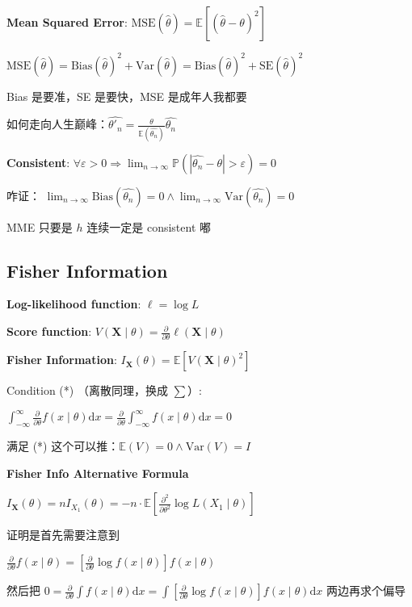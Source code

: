\documentclass[9pt,landscape]{article}
\begin{document}
\begin{multicols}{3}
\textbf{Mean Squared Error}: $\mathrm{MSE}(\hat{\theta})=\mathbb{E}\left[\left(\hat{\theta}-\theta\right)^2\right]$

$\mathrm{MSE}(\hat{\theta})=\mathrm{Bias}(\hat{\theta})^2+\mathrm{Var}(\hat\theta)=\mathrm{Bias}(\hat{\theta})^2+\mathrm{SE}(\hat\theta)^2$

Bias 是要准，SE 是要快，MSE 是成年人我都要

如何走向人生巅峰：$\widehat{\theta'_n}=\frac{\theta}{\mathbb{E}\left(\widehat{\theta_n}\right)}\widehat{\theta_n}$

\textbf{Consistent}: $\forall\varepsilon>0\Rightarrow\lim_{n\to\infty}\mathbb{P}(|\hat{\theta_n}-\theta|>\varepsilon)=0$

咋证： $\lim_{n\to\infty}\mathrm{Bias}(\hat{\theta_n})=0\land\lim_{n\to\infty}\mathrm{Var}(\hat{\theta_n})=0$

MME 只要是 $h$ 连续一定是 consistent 嘟

\subsection{Fisher Information}

\textbf{Log-likelihood function}: $\ell=\log L$

\textbf{Score function}: $V(\boldsymbol{X}\mid\theta)=\frac{\partial}{\partial\theta}\ell(\boldsymbol{X}\mid\theta)$

\textbf{Fisher Information}: $I_{\boldsymbol{X}}(\theta)=\mathbb{E}\left[V(\boldsymbol{X}\mid\theta)^2\right]$

Condition (*) （离散同理，换成 $\sum$）:

$\int_{-\infty}^{\infty}\frac{\partial}{\partial\theta}f(x\mid\theta)\mathrm{d}x=\frac{\partial}{\partial\theta}\int_{-\infty}^{\infty}f(x\mid\theta)\mathrm{d}x=0$

满足 (*) 这个可以推：$\mathbb{E}(V)=0\land \mathrm{Var}(V)=I$

\textbf{Fisher Info Alternative Formula}

$I_{\boldsymbol{X}}(\theta)=nI_{X_1}(\theta)=-n\cdot\mathbb{E}[\frac{\partial^2}{\partial\theta^2}\log L(X_1\mid\theta)]$

证明是首先需要注意到

$\frac{\partial}{\partial\theta}f(x\mid\theta)=\left[\frac{\partial}{\partial\theta}\log f(x\mid\theta)\right]f(x\mid\theta)$ 

然后把 $0=\frac{\partial}{\partial\theta}\int f(x\mid\theta)\mathrm{d}x=\int\left[\frac{\partial}{\partial\theta}\log f(x\mid\theta)\right]f(x\mid\theta)\mathrm{d}x$ 两边再求个偏导


\end{multicols}
\end{document}

